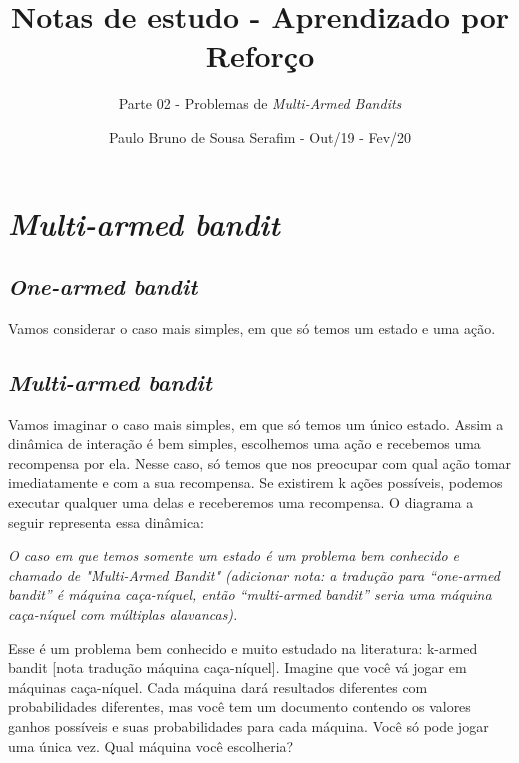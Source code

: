 \documentclass{article}
\title{Notas de estudo - Aprendizado por Reforço}
\author{Parte 02 - Problemas de \emph{Multi-Armed Bandits}}
\date{Paulo Bruno de Sousa Serafim - Out/19 - Fev/20}
\begin{document}
\maketitle

    \section{\textit{Multi-armed bandit}}
    
        \subsection{\emph{One-armed bandit}}
        
            Vamos considerar o caso mais simples, em que só temos um estado e uma ação. 
        
        \subsection{\emph{Multi-armed bandit}}
    
            Vamos imaginar o caso mais simples, em que só temos um único estado. Assim a dinâmica de interação é bem simples, escolhemos uma ação e recebemos uma recompensa por ela. Nesse caso, só temos que nos preocupar com qual ação tomar imediatamente e com a sua recompensa. Se existirem k ações possíveis, podemos executar qualquer uma delas e receberemos uma recompensa. O diagrama a seguir representa essa dinâmica:
        
            \begin{center}
                \simplebandit
            \end{center}
        
            \textit{O caso em que temos somente um estado é um problema bem conhecido e chamado de "Multi-Armed Bandit" (adicionar nota: a tradução para ``one-armed bandit'' é máquina caça-níquel, então ``multi-armed bandit'' seria uma máquina caça-níquel com múltiplas alavancas).}
            
            Esse é um problema bem conhecido e muito estudado na literatura: k-armed bandit [nota tradução máquina caça-níquel]. Imagine que você vá jogar em máquinas caça-níquel. Cada máquina dará resultados diferentes com probabilidades diferentes, mas você tem um documento contendo os valores ganhos possíveis e suas probabilidades para cada máquina. Você só pode jogar uma única vez. Qual máquina você escolheria?
        
\end{document}
